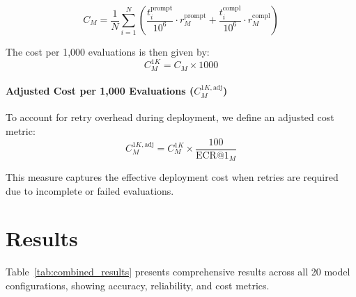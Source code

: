 \documentclass[letterpaper]{article} %
\begin{document}
\begin{equation}
C_M = \frac{1}{N}\sum_{i=1}^{N} \left( \frac{t_i^{\text{prompt}}}{10^6} \cdot r_M^{\text{prompt}} + \frac{t_i^{\text{compl}}}{10^6} \cdot r_M^{\text{compl}} \right)
\end{equation}

The cost per 1,000 evaluations is then given by:
\begin{equation}
C_M^{1K} = C_M \times 1000
\end{equation}

\paragraph{Adjusted Cost per 1,000 Evaluations ($C_M^{1K, \text{adj}}$)}
To account for retry overhead during deployment, we define an adjusted cost metric:
\begin{equation}
C_M^{1K, \text{adj}} = C_M^{1K} \times \frac{100}{\text{ECR@1}_M}
\end{equation}

This measure captures the effective deployment cost when retries are required due to incomplete or failed evaluations.

\section{Results}
\label{sec:results}

Table~\ref{tab:combined_results} presents comprehensive results across all 20 model configurations, showing accuracy, reliability, and cost metrics.
\end{document}
